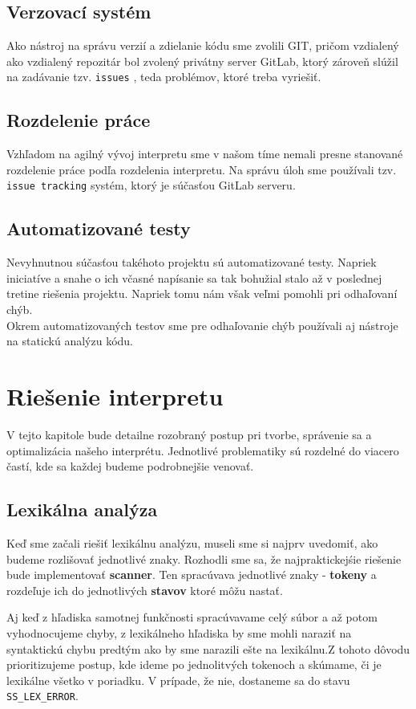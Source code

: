 \documentclass[12pt, a4paper]{article}
\begin{document}
        \subsection{Verzovací systém}
			Ako nástroj na správu verzií a zdielanie kódu sme zvolili GIT, pričom vzdialený ako vzdialený repozitár bol zvolený privátny server GitLab, ktorý zároveň slúžil na zadávanie tzv. \texttt{issues} , teda problémov, ktoré treba vyriešiť.
		\subsection{Rozdelenie práce}
			Vzhľadom na agilný vývoj interpretu sme v našom tíme nemali presne stanované rozdelenie práce podľa rozdelenia interpretu. Na správu úloh sme používali tzv. \texttt{issue tracking} systém, ktorý je súčasťou GitLab serveru.
        \subsection{Automatizované testy}
	        Nevyhnutnou súčasťou takéhoto projektu sú automatizované testy. Napriek iniciatíve a snahe o ich včasné napísanie sa tak bohužial stalo až v poslednej tretine riešenia projektu. Napriek tomu nám však veľmi pomohli pri odhaľovaní chýb.\\
	        Okrem automatizovaných testov sme pre odhaľovanie chýb používali aj nástroje na statickú analýzu kódu.
	\newpage
	\section{Riešenie interpretu}
    V tejto kapitole bude detailne rozobraný postup pri tvorbe, správenie sa a optimalizácia našeho interprétu. Jednotlivé problematiky sú rozdelné do viacero častí, kde sa každej budeme podrobnejšie venovať.

        \subsection{Lexikálna analýza}
        Keď sme začali riešiť lexikálnu analýzu, museli sme si najprv uvedomiť, ako budeme rozlišovať jednotlivé znaky. Rozhodli sme sa, že najpraktickejśie riešenie bude implementovať  \textbf{scanner}. Ten spracúvava jednotlivé znaky - \textbf{tokeny} a rozdeľuje ich do jednotlivých \textbf{stavov} ktoré môžu nastať.

        Aj keď z hľadiska samotnej funkčnosti spracúvavame celý súbor a až potom vyhodnocujeme chyby, z lexikálneho hľadiska by sme mohli naraziť na syntaktickú chybu predtým ako by sme narazili ešte na lexikálnu.Z tohoto dôvodu prioritizujeme postup, kde ideme po jednolitvých tokenoch a skúmame, či je lexikálne všetko v poriadku. V prípade, že nie, dostaneme sa do stavu \verb|SS_LEX_ERROR|.
\end{document}
